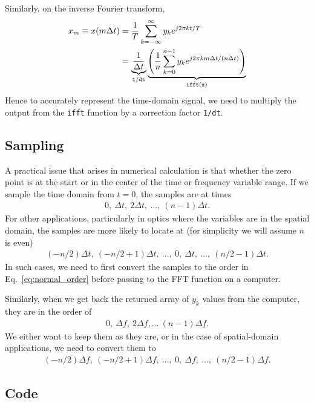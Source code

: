 \documentclass{revtex4-2}
\begin{document}
Similarly, on the inverse Fourier transform,
\begin{align}
    x_m \equiv x(m\Delta t) &= \frac{1}{T} \sum_{k=-\infty}^\infty y_k e^{j2\pi kt/T}\\
    &= \underbrace{\frac{1}{\Delta t}}_{{\tt 1/dt}}
       \underbrace{\left(\frac{1}{n}\sum_{k=0}^{n-1} y_k e^{j2\pi km\Delta t/(n\Delta t)}\right)}_{{\tt ifft(x)}}
\end{align}
Hence to accurately represent the time-domain signal, we need to multiply the output from the {\tt ifft}
function by a correction factor {\tt 1/dt}.

\subsection{Sampling}

A practical issue that arises in numerical calculation is that whether the zero point is at the
start or in the center of the time or frequency variable range. If we sample the time domain from
$t = 0$, the samples are at times
\begin{align}
    0, \ \Delta t, \ 2\Delta t, \ ..., \ (n-1)\Delta t. \label{eq:normal_order}
\end{align}
For other applications, particularly in optics where the variables are in the spatial domain,
the samples are more likely to locate at (for simplicity we will assume $n$ is even)
\begin{align}
    (-n/2)\Delta t, \ (-n/2+1)\Delta t,\ ...,\ 0,\ \Delta t,\ ...,\ (n/2-1)\Delta t.
\end{align}
In such cases, we need to first convert the samples to the order in Eq.~\ref{eq:normal_order}
before passing to the FFT function on a computer.

Similarly, when we get back the returned array of $y_k$ values from the computer, they are in
the order of
\begin{align}
    0, \ \Delta f, \ 2\Delta f, ... \ (n-1)\Delta f.
\end{align}
We either want to keep them as they are, or in the case of spatial-domain applications, we need
to convert them to
\begin{align}
    (-n/2)\Delta f, \ (-n/2+1)\Delta f,\ ...,\ 0,\ \Delta f,\ ...,\ (n/2-1)\Delta f.
\end{align}

\subsection{Code}
\end{document}
